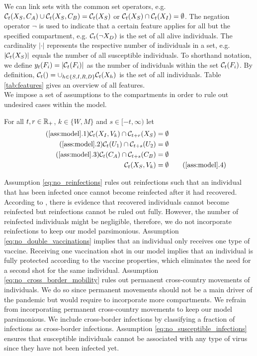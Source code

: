 We can link sets with the common set operators, e.g. $\mathcal{C}_t(X_S, C_A) \cup \mathcal{C}_t(X_S, C_B) = \mathcal{C}_t(X_S)$ or $\mathcal{C}_t(X_S) \cap \mathcal{C}_t(X_I) = \emptyset$. The negation operator $\neg$ is used to indicate that a certain feature applies for all but the specified compartment, e.g. $\mathcal{C}_t(\neg X_D)$ is the set of all alive individuals. The cardinality $|\cdot|$ represents the respective number of individuals in a set, e.g. $|\mathcal{C}_t(X_S)|$ equals the number of all susceptible individuals. To shorthand notation, we define $y_t(F_i) = |\mathcal{C}_t(F_i)|$ as the number of individuals within the set $\mathcal{C}_t(F_i)$. By definition, $\mathcal{C}_t() = \cup_{h \in \{ S, I, R,D\}} \mathcal{C}_t(X_h)$ is the set of all individuals. Table \ref{tab:features} gives an overview of all features. \\


We impose a set of assumptions to the compartments in order to rule out undesired cases within the model.
\begin{assumption}\label{ass:model}
For all $t,r \in \mathbb{R}_+$, $k \in \{W,M\}$ and $s \in [-t, \infty)$ let
\begin{align*}
\tag{\ref{ass:model}.1} 
\label{eq:no_reinfections}
\set(X_I, V_k) \cap \mathcal{C}_{t+r}(X_S) &= \emptyset \\
\tag{\ref{ass:model}.2} 
\label{eq:no_double_vaccinations}
\set(U_1) \cap \mathcal{C}_{t+s}(U_2) &= \emptyset \\
\tag{\ref{ass:model}.3} 
\label{eq:no_cross_border_mobility}
\set(C_A) \cap \mathcal{C}_{t+s}(C_B) &= \emptyset  \\
\set(X_S, V_k) &= \emptyset
\tag{\ref{ass:model}.4}
\label{eq:no_susceptible_infections}
\end{align*}
\end{assumption}
\noindent Assumption \ref{eq:no_reinfections} rules out reinfections such that an individual that has been infected once cannot become reinfected after it had recovered. According to \cite{Roy.2020}, there is evidence that recovered individuals cannot become reinfected but reinfections cannot be ruled out fully. However, the number of reinfected individuals might be negligible, therefore, we do not incorporate reinfections to keep our model parsimonious. Assumption \ref{eq:no_double_vaccinations} implies that an individual only receives one type of vaccine. Receiving one vaccination shot in our model implies that an individual is fully protected according to the vaccine properties, which eliminates the need for a second shot for the same individual. Assumption \ref{eq:no_cross_border_mobility} rules out permanent cross-country movements of individuals. We do so since  permanent movements should not be a main driver of the pandemic but would require to incorporate more compartments. We refrain from incorporating permanent cross-country movements to keep our model parsimonious. We include cross-border infections by classifying a fraction of infections as cross-border infections.
Assumption \ref{eq:no_susceptible_infections} ensures that susceptible individuals cannot be associated with any type of virus since they have not been infected yet.

